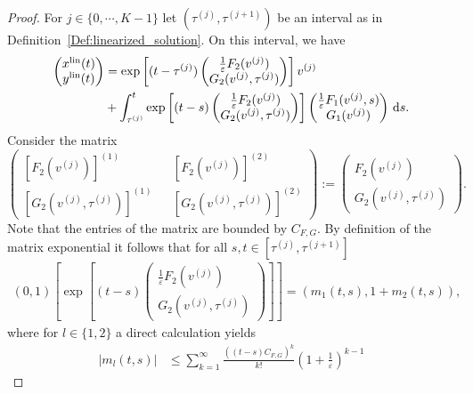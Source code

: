 \documentclass[12pt]{article}
\def\txtd{{\textnormal{d}}}
\begin{document}
\begin{proof}
For $j\in \{0,\cdots, K-1\}$ let $(\tau^{(j)},\tau^{(j+1)})$ be an interval 
as in Definition~\ref{Def:linearized_solution}. On this interval, we have
\begin{align}
\left(\begin{matrix}x^{\mathrm{lin}}(t)\\ 
y^{\mathrm{lin}}(t) \end{matrix} \right)
&= \exp\left[(t-\tau^{(j)}) \left(\begin{matrix}
\frac{1}{\varepsilon}F_2(v^{(j)})\\ G_2(v^{(j)},\tau^{(j)})\end{matrix}\right)
\right]v^{(j)}\notag\\
&+\int_{\tau^{(j)}}^{t}\exp\left[(t-s) \left(
\begin{matrix} \frac{1}{\varepsilon}F_2(v^{(j)})\\ G_2(v^{(j)},\tau^{(j)})
\end{matrix}\right)\right]\left(\begin{matrix}\frac{1}{\varepsilon}F_1(v^{(j)},s)\\
G_1(v^{(j)})\end{matrix}\right)\,\txtd s.\label{solution_lin_syst}
\end{align}
Consider the matrix
\[
\left(\begin{matrix}
[F_2(v^{(j)})]^{(1)} && [F_2(v^{(j)})]^{(2)}\\
[G_2(v^{(j)},\tau^{(j)})]^{(1)} && [G_2(v^{(j)},\tau^{(j)})]^{(2)}
\end{matrix}
\right):=\left(
\begin{matrix}
F_2(v^{(j)})\\
G_2(v^{(j)},\tau^{(j)})
\end{matrix}\right).
\]
Note that the entries of the matrix are bounded by $C_{F,G}$. By definition of 
the matrix exponential it follows that for all $s,t\in [\tau^{(j)},\tau^{(j+1)}]$ 
\begin{align*}
(0,1)\left[\exp\left[(t-s)\left(\begin{matrix}\frac{1}{\varepsilon}
F_2(v^{(j)})\\ G_2(v^{(j)},\tau^{(j)}) \end{matrix}\right)\right]\right]
= ( m_1(t,s),1+ m_2(t,s)),
\end{align*}
where for $l\in \{1,2\}$ a direct calculation yields
\begin{align*}
|m_l(t,s)| &\leq \sum_{k=1}^\infty \frac{((t-s)C_{F,G})^k}{k!}\left(1+\frac1\varepsilon\right)^{k-1} 

\end{align*}
\end{proof}
\end{document}

